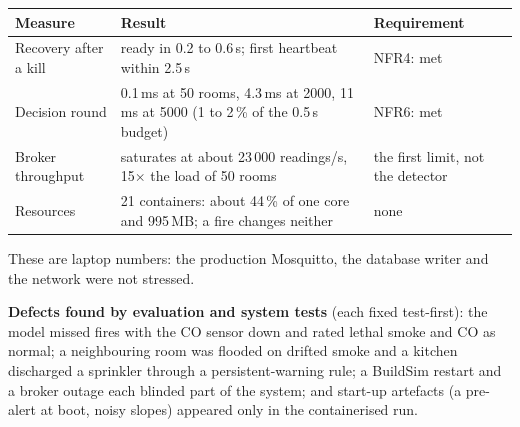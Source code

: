 \documentclass[11pt]{article}
\begin{document}
\begin{center}
\begin{tabular}{@{}L{3.2cm}L{7.4cm}L{3.6cm}@{}}
\toprule
Measure & Result & Requirement\\
\midrule
Recovery after a kill & ready in 0.2 to 0.6\,s; first heartbeat within 2.5\,s & NFR4: met\\
Decision round & 0.1\,ms at 50 rooms, 4.3\,ms at 2000, 11\,ms at 5000 (1 to 2\,\% of the 0.5\,s budget) & NFR6: met\\
Broker throughput & saturates at about 23\,000 readings/s, 15$\times$ the load of 50 rooms & the first limit, not the detector\\
Resources & 21 containers: about 44\,\% of one core and 995\,MB; a fire changes neither & none\\
\bottomrule
\end{tabular}
\end{center}
These are laptop numbers: the production Mosquitto, the database writer and the network were not stressed.

\textbf{Defects found by evaluation and system tests} (each fixed test-first): the model missed fires with the CO sensor down and rated lethal smoke and CO as normal; a neighbouring room was flooded on drifted smoke and a kitchen discharged a sprinkler through a persistent-warning rule; a BuildSim restart and a broker outage each blinded part of the system; and start-up artefacts (a pre-alert at boot, noisy slopes) appeared only in the containerised run.
\end{document}
